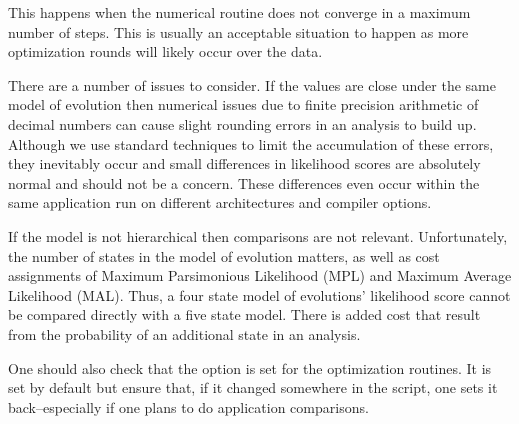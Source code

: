 {This happens when the numerical routine
does not converge in a maximum number of steps. This is usually an
acceptable situation to happen as more optimization rounds will
likely occur over the data.}

{There are a number of issues to consider. If the
values are close under the same model of evolution then numerical
issues due to finite precision arithmetic of decimal numbers can
cause slight rounding errors in an analysis to build up. Although
we use standard techniques to limit the accumulation of these errors,
they inevitably occur and small differences in likelihood scores
are absolutely normal and should not be a concern. These differences even
occur within the same application run on different architectures
and compiler options.

If the model is not hierarchical then comparisons are not relevant.
Unfortunately, the number of states in the model of evolution
matters, as well as cost assignments of Maximum Parsimonious
Likelihood (MPL) and Maximum Average Likelihood (MAL). Thus, a four
state model of evolutions' likelihood score cannot be compared
directly with a five state model. There is added cost that result
from the probability of an additional state in an analysis.

One should also check that the  option is
set for the optimization routines.  It is set by default but ensure
that, if it changed somewhere in the script, one sets it back--especially 
if one plans to do application comparisons.}
